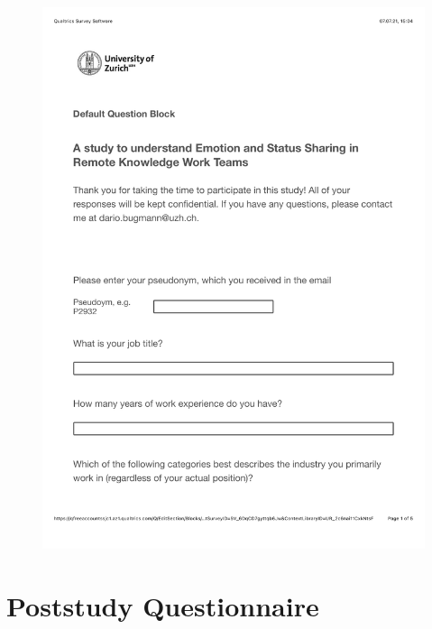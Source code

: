 \begin{figure}[h]
    \centering
    \includegraphics[width=\linewidth, page=5]{./documents/prestudy_questionnaire.pdf}
\end{figure}


\chapter{Poststudy Questionnaire}
\label{chapter:poststudy_questionnaire}

